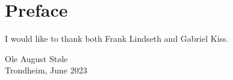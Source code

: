 \chapter*{Preface}

I would like to thank both Frank Lindseth and Gabriel Kiss.

\vspace{3cm}
\begin{center}
    Ole August Støle \\
    Trondheim, June 2023
\end{center}